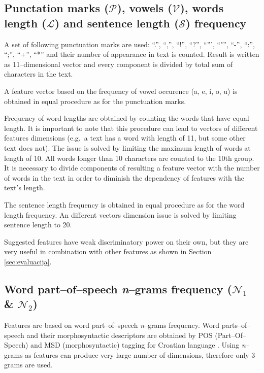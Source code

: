 \documentclass[11pt,english]{article}
\begin{document}
\begin{multicols}{2}
\subsection{Punctation marks ($\mathcal{P}$), vowels ($\mathcal{V}$), words
length ($\mathcal{L}$) and sentence length ($\mathcal{S}$) frequency}
\label{sec:znacajke-manje}
A set of following punctuation marks are used: ``.'', ``,'', ``!'', ``?'',
``''', ``"'', ``-'', ``:'', ``;'', ``+'', ``*'' and their number of appearance in
text is counted. Result is written as 11--dimensional vector and every
component is divided by total sum of characters in the text.

A feature vector based on the frequency of vowel occurence (a, e, i, o, u) is
obtained in equal procedure as for the punctuation marks.

Frequency of word lengths are obtained by counting the words that have equal
length. It is important to note that this procedure can lead to vectors of
different features dimensions (e.g.\ a text has a word with length of 11,
but some other text does not). The issue is solved by limiting the maximum
length of words at length of 10. All words longer than 10 characters are
counted to the 10th group. It is necessary to divide components of resulting a feature
vector with the number of words in the text in order to diminish the dependency
of features with the text's length.

The sentence length frequency is obtained in equal procedure as for the word
length frequency. An different vectors dimension issue is solved by limiting
sentence length to 20.

Suggested features have weak discriminatory power on their own, but they are
very useful in combination with other features as shown in Section \ref{sec:evaluacija}.

\subsection{Word part--of--speech \emph{n}--grams frequency ($\mathcal{N}_1$ \&
$\mathcal{N}_2$)}
\label{sec:ngrami-tipova}
Features are based on word part--of--speech \emph{n}--grams frequency. Word
parts--of--speech and their morphosyntactic descriptors are obtained by POS
(Part--Of--Speech) and MSD (morphosyntactic) tagging for Croatian language
\citep{snajder08automatic}. Using \emph{n}--grams as features can produce very
large number of dimensions, therefore only 3--grams are used.


\end{multicols}
\end{document}
